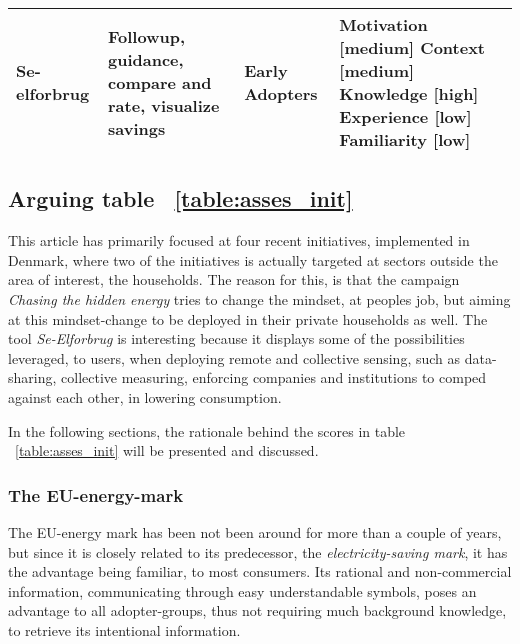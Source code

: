 \documentclass[journal]{IEEEtran}
\begin{document}
\begin{table*}[t2]
\begin{tabular}{|p{} |p{3.5cm} |p{2.5cm} |p{4.5cm} |}
Se-elforbrug & 
Followup, guidance, compare and rate, visualize savings  & 
Early Adopters &
Motivation  [medium] \newline 
Context	    [medium] \newline 
Knowledge	[high] \newline 
Experience  [low] \newline 
Familiarity [low] \\
\hline
\end{tabular}
\label{table:asses_init} %
\end{table*}

\subsection{Arguing table ~\ref{table:asses_init}}
This article has primarily focused at four recent initiatives, implemented in Denmark, where two of the initiatives is actually targeted at sectors outside the area of interest, the households. The reason for this, is that the campaign \textit{Chasing the hidden energy} tries to change the mindset, at peoples job, but aiming at this mindset-change to be deployed in their private households as well. The tool \textit{Se-Elforbrug} is interesting because it displays some of the possibilities leveraged, to users, when deploying remote and collective sensing, such as data-sharing, collective measuring, enforcing companies and institutions to comped against each other, in lowering consumption.\newline

In the following sections, the rationale behind the scores in table  ~\ref{table:asses_init}
will be presented and discussed.

\subsubsection{The EU-energy-mark}
The EU-energy mark has been not been around for more than a couple of years, but since it is closely related to its predecessor, the \textit{electricity-saving mark}, it has the advantage being familiar, to most consumers. Its rational and non-commercial information, communicating through easy understandable symbols, poses an advantage to all adopter-groups, thus not requiring much background knowledge, to retrieve its intentional information.
\end{document}
